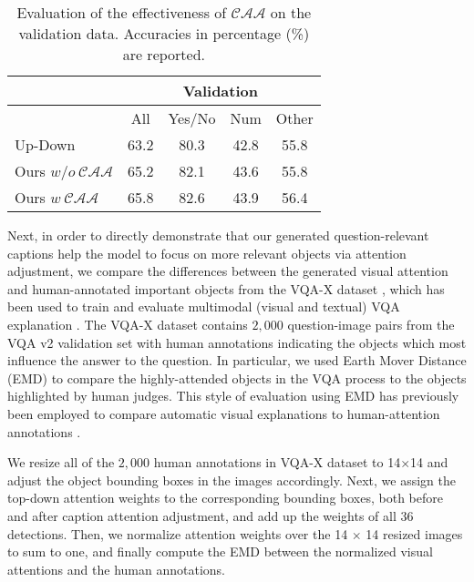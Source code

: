 \documentclass[11pt,a4paper]{article}
\begin{document}
\begin{table}[h]
\centering
\begin{tabular}{l|cccc}
\hline\toprule
                  & \multicolumn{4}{c}{Validation} \\  \hline
                  & {\footnotesize All }   & {\footnotesize Yes/No}  & {\footnotesize Num}   & {\footnotesize Other}  \\ \hline\hline
Up-Down  & 63.2  & 80.3    & 42.8 & 55.8   \\
Ours $w/o~\mathcal{CAA}$  & 65.2  &  82.1 & 43.6 & 55.8\\
Ours $w~\mathcal{CAA}$ &  65.8   &  82.6&  43.9& 56.4\\\bottomrule
\end{tabular}
\caption{Evaluation of the effectiveness of $\mathcal{CAA}$ on the validation data. Accuracies in percentage (\%) are reported.}
\label{tab:relationship1}
\end{table}

Next, in order to directly demonstrate that our generated question-relevant captions help the model to focus on more relevant objects via attention adjustment, we compare the differences between the generated visual attention and human-annotated important objects from the VQA-X dataset \cite{park2018multimodal}, which has been used to train and evaluate multimodal (visual and textual) VQA explanation \cite{wu2018faithful}. The VQA-X dataset contains $2,000$ question-image pairs from the VQA v2 validation set with human annotations indicating the objects which most influence the answer to the question. In particular, we used Earth Mover Distance (EMD) \cite{rubner2000earth} to compare the highly-attended objects in the VQA process to the objects highlighted by human judges.
This style of evaluation using EMD has previously been employed to compare automatic visual explanations to human-attention annotations \cite{selvaraju2017grad,park2018multimodal}.

We resize all of the $2,000$ human annotations in VQA-X dataset to 14$\times$14 and adjust the object bounding boxes in the images accordingly. Next, we assign the top-down attention weights to the corresponding bounding boxes, both before and after caption attention adjustment, and add up the weights of all $36$ detections. Then, we normalize attention weights over the 14 $\times$ 14 resized images to sum to one, and finally compute the EMD between the normalized visual attentions and the human annotations.
\end{document}
